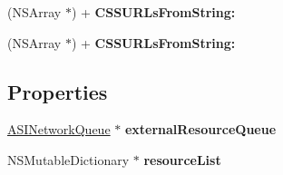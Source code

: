 \begin{DoxyCompactItemize}
\item 
\hypertarget{interface_a_s_i_web_page_request_07_08_a6e3a1a7118b63293bfc19ac5f157652a}{
(\-N\-S\-Array $\ast$) + {\bfseries \-C\-S\-S\-U\-R\-Ls\-From\-String\-:}}
\label{interface_a_s_i_web_page_request_07_08_a6e3a1a7118b63293bfc19ac5f157652a}

\item 
\hypertarget{interface_a_s_i_web_page_request_07_08_a6e3a1a7118b63293bfc19ac5f157652a}{
(\-N\-S\-Array $\ast$) + {\bfseries \-C\-S\-S\-U\-R\-Ls\-From\-String\-:}}
\label{interface_a_s_i_web_page_request_07_08_a6e3a1a7118b63293bfc19ac5f157652a}

\end{DoxyCompactItemize}
\subsection*{\-Properties}
\begin{DoxyCompactItemize}
\item 
\hypertarget{interface_a_s_i_web_page_request_07_08_ac9884e87a953f62ee63f8bfe8d1c68bb}{
\hyperlink{interface_a_s_i_network_queue}{\-A\-S\-I\-Network\-Queue} $\ast$ {\bfseries external\-Resource\-Queue}}
\label{interface_a_s_i_web_page_request_07_08_ac9884e87a953f62ee63f8bfe8d1c68bb}

\item 
\hypertarget{interface_a_s_i_web_page_request_07_08_a1f3c22bb6932c26ad53697192ee30986}{
\-N\-S\-Mutable\-Dictionary $\ast$ {\bfseries resource\-List}}
\label{interface_a_s_i_web_page_request_07_08_a1f3c22bb6932c26ad53697192ee30986}

\end{DoxyCompactItemize}


